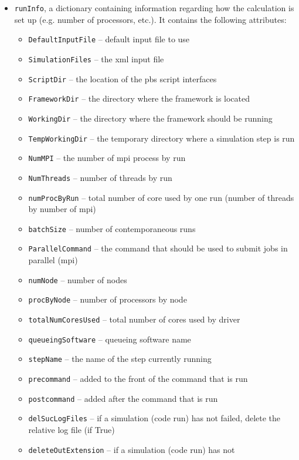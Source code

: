 \begin{itemize}
  \item \texttt{runInfo}, a dictionary containing information regarding how the
  calculation is set up (e.g. number of processors, etc.).
  It contains the following attributes:
  \begin{itemize}
    \item \texttt{DefaultInputFile} -- default input file to use
    \item \texttt{SimulationFiles} -- the xml input file
    \item \texttt{ScriptDir} -- the location of the pbs script interfaces
    \item \texttt{FrameworkDir} -- the directory where the framework is located
    \item \texttt{WorkingDir} -- the directory where the framework should be
    running
    \item \texttt{TempWorkingDir} -- the temporary directory where a simulation
    step is run
    \item \texttt{NumMPI} -- the number of mpi process by run
    \item \texttt{NumThreads} -- number of threads by run
    \item \texttt{numProcByRun} -- total number of core used by one run (number
    of threads by number of mpi)
    \item \texttt{batchSize} -- number of contemporaneous runs
    \item \texttt{ParallelCommand} -- the command that should be used to submit
    jobs in parallel (mpi)
    \item \texttt{numNode} -- number of nodes
    \item \texttt{procByNode} -- number of processors by node
    \item \texttt{totalNumCoresUsed} -- total number of cores used by driver
    \item \texttt{queueingSoftware} -- queueing software name
    \item \texttt{stepName} -- the name of the step currently running
    \item \texttt{precommand} -- added to the front of the command that is run
    \item \texttt{postcommand} -- added after the command that is run
    \item \texttt{delSucLogFiles} -- if a simulation (code run) has not failed,
    delete the relative log file (if True)
    \item \texttt{deleteOutExtension} -- if a simulation (code run) has not

\end{itemize}
\end{itemize}
